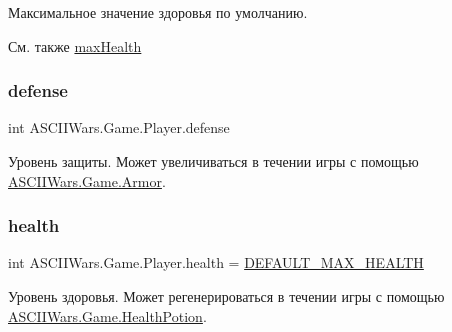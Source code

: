 Максимальное значение здоровья по умолчанию. 

\begin{DoxySeeAlso}{См. также}
\hyperlink{class_a_s_c_i_i_wars_1_1_game_1_1_player_acfd121f865f0e5a87f177e93c82feadc}{max\+Health} 
\end{DoxySeeAlso}
\hypertarget{class_a_s_c_i_i_wars_1_1_game_1_1_player_a1dc39c7d8054c42dcb7af70e78b3be02}{}\label{class_a_s_c_i_i_wars_1_1_game_1_1_player_a1dc39c7d8054c42dcb7af70e78b3be02} 
\subsubsection{\texorpdfstring{defense}{defense}}
{\footnotesize\ttfamily int A\+S\+C\+I\+I\+Wars.\+Game.\+Player.\+defense}



Уровень защиты. Может увеличиваться в течении игры с помощью \hyperlink{class_a_s_c_i_i_wars_1_1_game_1_1_armor}{A\+S\+C\+I\+I\+Wars.\+Game.\+Armor}. 

\hypertarget{class_a_s_c_i_i_wars_1_1_game_1_1_player_a8f364a47ef452b6c99bc13b7bdaae7ca}{}\label{class_a_s_c_i_i_wars_1_1_game_1_1_player_a8f364a47ef452b6c99bc13b7bdaae7ca} 
\subsubsection{\texorpdfstring{health}{health}}
{\footnotesize\ttfamily int A\+S\+C\+I\+I\+Wars.\+Game.\+Player.\+health = \hyperlink{class_a_s_c_i_i_wars_1_1_game_1_1_player_ab5921985db319187e317563c15ef48dc}{D\+E\+F\+A\+U\+L\+T\+\_\+\+M\+A\+X\+\_\+\+H\+E\+A\+L\+TH}}



Уровень здоровья. Может регенерироваться в течении игры с помощью \hyperlink{class_a_s_c_i_i_wars_1_1_game_1_1_health_potion}{A\+S\+C\+I\+I\+Wars.\+Game.\+Health\+Potion}. 

\hypertarget{class_a_s_c_i_i_wars_1_1_game_1_1_player_a04acfaa196162f89bfae7aee5ec45480}{}\label{class_a_s_c_i_i_wars_1_1_game_1_1_player_a04acfaa196162f89bfae7aee5ec45480} 
